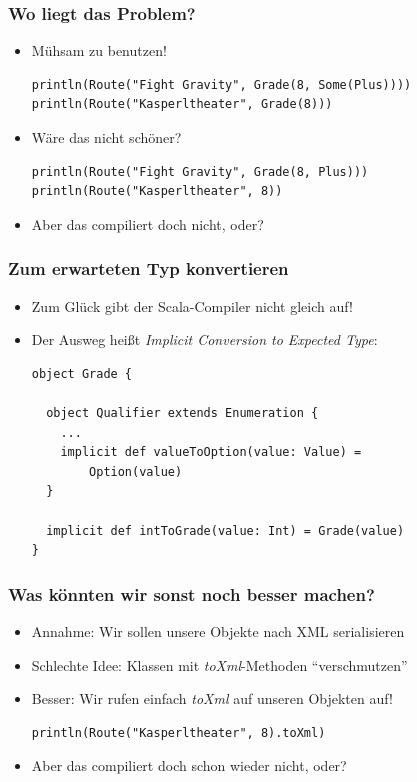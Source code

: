 \documentclass{beamer}
\begin{document}
\begin{frame}[fragile]
  \frametitle{Wo liegt das Problem?}
  \begin{itemize}
    \item M\"uhsam zu benutzen!
    \begin{lstlisting}
println(Route("Fight Gravity", Grade(8, Some(Plus))))
println(Route("Kasperltheater", Grade(8)))
    \end{lstlisting}
    \item W\"are das nicht sch\"oner?
    \begin{lstlisting}
println(Route("Fight Gravity", Grade(8, Plus)))
println(Route("Kasperltheater", 8))
    \end{lstlisting}
    \item Aber das compiliert doch nicht, oder?
  \end{itemize}
\end{frame}

\begin{frame}[fragile]
  \frametitle{Zum erwarteten Typ konvertieren}
  \begin{itemize}
    \item Zum Gl\"uck gibt der Scala-Compiler nicht gleich auf!
    \item Der Ausweg hei{\ss}t \emph{Implicit Conversion to Expected Type}:
    \begin{lstlisting}
object Grade {

  object Qualifier extends Enumeration {
    ...
    implicit def valueToOption(value: Value) =
        Option(value)
  }

  implicit def intToGrade(value: Int) = Grade(value)
}
    \end{lstlisting}
  \end{itemize}
\end{frame}

\begin{frame}[fragile]
  \frametitle{Was k\"onnten wir sonst noch besser machen?}
  \begin{itemize}
    \item Annahme: Wir sollen unsere Objekte nach XML serialisieren
    \item Schlechte Idee: Klassen mit \emph{toXml}-Methoden "`verschmutzen"'
    \item Besser: Wir rufen einfach \emph{toXml} auf unseren Objekten auf!
    \begin{lstlisting}
println(Route("Kasperltheater", 8).toXml)
    \end{lstlisting}
    \item Aber das compiliert doch schon wieder nicht, oder?
  \end{itemize}
\end{frame}
\end{document}
